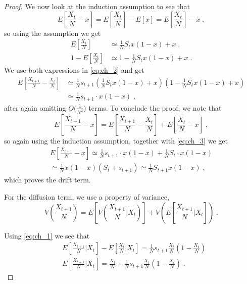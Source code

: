 \documentclass[12pt]{extarticle}
\begin{document}
\begin{proof}
We now look at the induction assumption to see that
\begin{equation}
E\left[\frac{X_t}{N}-x\right]
= E\left[\frac{X_t}{N}\right]-E[x]
= E\left[\frac{X_t}{N}\right]-x \;,
\end{equation}
so using the assumption we get
\begin{equation}
\begin{split}
E\left[\frac{X_t}{N}\right] 
&\simeq \frac{1}{N} S_t x(1-x)+x \;, \\
1 - E\left[\frac{X_t}{N}\right] 
&\simeq 1- \frac{1}{N} S_t x(1-x)+x \;.
\end{split}
\end{equation}
We use both expressions in \cref{eq:ch_2} and get
\begin{equation}\label{eq:ch_3}
\begin{split}
E\left[\frac{X_{t+1}}{N}-\frac{X_t}{N}\right] 
&\simeq \frac{1}{N}s_{t+1} \left(\frac{1}{N} S_t x(1-x)+x \right)\left(1- \frac{1}{N} S_t x(1-x)+x \right) \\
&\simeq  \frac{1}{N}s_{t+1}\cdot x(1-x) \;,
\end{split}
\end{equation}
after again omitting $O\big(\frac{1}{N^2}\big)$ terms.
To conclude the proof, we note that
\begin{equation}
E\left[\frac{X_{t+1}}{N}-x\right] 
= E\left[\frac{X_{t+1}}{N}-\frac{X_t}{N}\right] + E\left[\frac{X_t}{N}-x\right] \;,
\end{equation}
so again using the induction assumption, together with \cref{eq:ch_3} we get
\begin{equation}
\begin{split}
E\left[\frac{X_{t+1}}{N}-x\right] \simeq \frac{1}{N}s_{t+1}\cdot x(1-x) + \frac{1}{N}S_t\cdot x(1-x) \\
\simeq \frac{1}{N}x(1-x)(S_t + s_{t+1}) 
\simeq \frac{1}{N} S_{t+1} x(1-x) \;,
\end{split}
\end{equation}
which proves the drift term.

For the diffusion term, we use a property of variance,
\begin{equation}\label{eq:ch_var}
V\left(\frac{X_{t+1}}{N}\right) 
= E\left[V\left(\frac{X_{t+1}}{N} \bigg|X_t \right)\right] + V\left(E\left[\frac{X_{t+1}}{N} \bigg|X_t \right]\right) \;.
\end{equation}

Using \cref{eq:ch_1} we see that
\begin{equation}\label{eq:ch_var1}
\begin{split}
&E\left[\frac{X_{t+1}}{N} \bigg|X_t \right] - E\left[\frac{X_{t}}{N} \bigg|X_t \right] 
= \frac{1}{N}s_{t+1}\frac{X_t}{N}\left(1-\frac{X_t}{N} \right) \\
&E\left[\frac{X_{t+1}}{N} \bigg|X_t \right] 
= \frac{X_t}{N} + \frac{1}{N}s_{t+1}\frac{X_t}{N}\left(1-\frac{X_t}{N} \right) \;.
\end{split}
\end{equation}


\end{proof}
\end{document}
